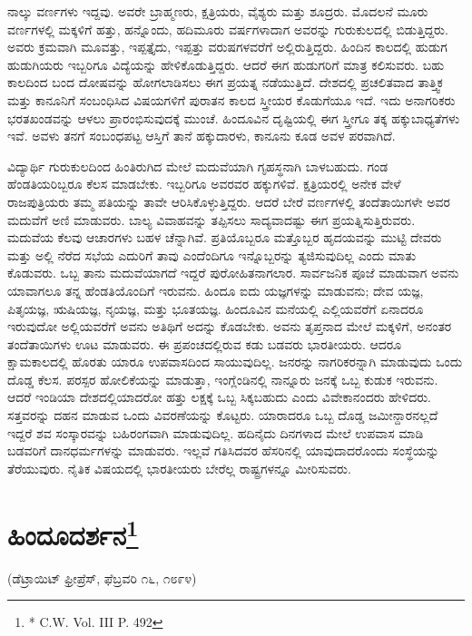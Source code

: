 ನಾಲ್ಕು ವರ್ಣಗಳು ಇದ್ದವು. ಅವರೇ ಬ್ರಾಹ್ಮಣರು, ಕ್ಷತ್ರಿಯರು, ವೈಶ್ಯರು ಮತ್ತು ಶೂದ್ರರು. ಮೊದಲನೆ ಮೂರು ವರ್ಣಗಳಲ್ಲಿ ಮಕ್ಕಳಿಗೆ ಹತ್ತು, ಹನ್ನೊಂದು, ಹದಿಮೂರು ವರ್ಷಗಳಾದಾಗ ಅವರನ್ನು ಗುರುಕುಲದಲ್ಲಿ ಬಿಡುತ್ತಿದ್ದರು. ಅವರು ಕ್ರಮವಾಗಿ ಮೂವತ್ತು, ಇಪ್ಪತ್ತೈದು, ಇಪ್ಪತ್ತು ವರುಷಗಳವರೆಗೆ ಅಲ್ಲಿರುತ್ತಿದ್ದರು. ಹಿಂದಿನ ಕಾಲದಲ್ಲಿ ಹುಡುಗ ಹುಡುಗಿಯರು ಇಬ್ಬರಿಗೂ ವಿದ್ಯೆಯನ್ನು ಹೇಳಿಕೊಡುತ್ತಿದ್ದರು. ಆದರೆ ಈಗ ಹುಡುಗರಿಗೆ ಮಾತ್ರ ಕಲಿಸುವರು. ಬಹು ಕಾಲದಿಂದ ಬಂದ ದೋಷವನ್ನು ಹೋಗಲಾಡಿಸಲು ಈಗ ಪ್ರಯತ್ನ ನಡೆಯುತ್ತಿದೆ. ದೇಶದಲ್ಲಿ ಪ್ರಚಲಿತವಾದ ತಾತ್ತ್ವಿಕ ಮತ್ತು ಕಾನೂನಿಗೆ ಸಂಬಂಧಿಸಿದ ವಿಷಯಗಳಿಗೆ ಪುರಾತನ ಕಾಲದ ಸ್ತ್ರೀಯರ ಕೊಡುಗೆಯೂ ಇದೆ. ಇದು ಅನಾಗರಿಕರು ಭರತಖಂಡವನ್ನು ಆಳಲು ಪ್ರಾರಂಭಿಸುವುದಕ್ಕೆ ಮುಂಚೆ. ಹಿಂದೂವಿನ ದೃಷ್ಟಿಯಲ್ಲಿ ಈಗ ಸ್ತ್ರೀಗೂ ತಕ್ಕ ಹಕ್ಕುಬಾಧ್ಯತೆಗಳು ಇವೆ. ಅವಳು ತನಗೆ ಸಂಬಂಧಪಟ್ಟ ಆಸ್ತಿಗೆ ತಾನೆ ಹಕ್ಕುದಾರಳು, ಕಾನೂನು ಕೂಡ ಅವಳ ಪರವಾಗಿದೆ.

ವಿದ್ಯಾರ್ಥಿ ಗುರುಕುಲದಿಂದ ಹಿಂತಿರುಗಿದ ಮೇಲೆ ಮದುವೆಯಾಗಿ ಗೃಹಸ್ಥನಾಗಿ ಬಾಳಬಹುದು. ಗಂಡ ಹೆಂಡತಿಯರಿಬ್ಬರೂ ಕೆಲಸ ಮಾಡಬೇಕು. ಇಬ್ಬರಿಗೂ ಅವರವರ ಹಕ್ಕುಗಳಿವೆ. ಕ್ಷತ್ರಿಯರಲ್ಲಿ ಅನೇಕ ವೇಳೆ ರಾಜಪುತ್ರಿಯರು ತಮ್ಮ ಪತಿಯನ್ನು ತಾವೇ ಆರಿಸಿಕೊಳ್ಳುತ್ತಿದ್ದರು. ಆದರೆ ಬೇರೆ ವರ್ಣಗಳಲ್ಲಿ ತಂದೆತಾಯಿಗಳೇ ಅವರ ಮದುವೆಗೆ ಅಣಿ ಮಾಡುವರು. ಬಾಲ್ಯ ವಿವಾಹವನ್ನು ತಪ್ಪಿಸಲು ಸಾದ್ಯವಾದಷ್ಟು ಈಗ ಪ್ರಯತ್ನಿಸುತ್ತಿರುವರು. ಮದುವೆಯ ಕೆಲವು ಆಚಾರಗಳು ಬಹಳ ಚೆನ್ನಾಗಿವೆ. ಪ್ರತಿಯೊಬ್ಬರೂ ಮತ್ತೊಬ್ಬರ ಹೃದಯವನ್ನು ಮುಟ್ಟಿ ದೇವರು ಮತ್ತು ಅಲ್ಲಿ ನೆರೆದ ಸಭೆಯ ಎದುರಿಗೆ ತಾವು ಎಂದೆಂದಿಗೂ ಇನ್ನೊಬ್ಬರನ್ನು ತ್ಯಜಿಸುವುದಿಲ್ಲ ಎಂದು ಮಾತು ಕೊಡುವರು. ಒಬ್ಬ ತಾನು ಮದುವೆ\break ಯಾಗದೆ ಇದ್ದರೆ ಪುರೋಹಿತನಾಗಲಾರ. ಸಾರ್ವಜನಿಕ ಪೂಜೆ ಮಾಡುವಾಗ ಅವನು ಯಾವಾಗಲೂ ತನ್ನ ಹೆಂಡತಿಯೊಂದಿಗೆ ಇರುವನು. ಹಿಂದೂ ಐದು ಯಜ್ಞಗಳನ್ನು ಮಾಡುವನು; ದೇವ ಯಜ್ಞ, ಪಿತೃಯಜ್ಞ, ಋಷಿಯಜ್ಞ, ನೃಯಜ್ಞ, ಮತ್ತು ಭೂತಯಜ್ಞ. ಹಿಂದೂವಿನ ಮನೆಯಲ್ಲಿ ಎಲ್ಲಿಯವರೆಗೆ ಏನಾದರೂ ಇರುವುದೋ ಅಲ್ಲಿಯವರೆಗೆ ಅವನು ಅತಿಥಿಗೆ ಅದನ್ನು ಕೊಡಬೇಕು. ಅವನು ತೃಪ್ತನಾದ ಮೇಲೆ ಮಕ್ಕಳಿಗೆ, ಅನಂತರ ತಂದೆತಾಯಿ\break ಗಳು ಊಟ ಮಾಡುವರು. ಈ ಪ್ರಪಂಚದಲ್ಲಿರುವ ಕಡು ಬಡವರು ಭಾರತೀಯರು. ಆದರೂ ಕ್ಷಾಮಕಾಲದಲ್ಲಿ ಹೊರತು ಯಾರೂ ಉಪವಾಸದಿಂದ ಸಾಯುವುದಿಲ್ಲ. ಜನರನ್ನು ನಾಗರಿಕರನ್ನಾಗಿ ಮಾಡುವುದು ಒಂದು ದೊಡ್ಡ ಕೆಲಸ. ಪರಸ್ಪರ ಹೋಲಿಕೆಯನ್ನು ಮಾಡುತ್ತಾ, ಇಂಗ್ಲೆಂಡಿನಲ್ಲಿ ನಾನ್ನೂರು ಜನಕ್ಕೆ ಒಬ್ಬ ಕುಡುಕ ಇರುವನು. ಆದರೆ ಇಂಡಿಯಾ ದೇಶದಲ್ಲಿಯಾದರೋ ಹತ್ತು ಲಕ್ಷಕ್ಕೆ ಒಬ್ಬ ಸಿಕ್ಕಬಹುದು ಎಂದು ವಿವೇಕಾನಂದರು ಹೇಳಿದರು. ಸತ್ತವರನ್ನು ದಹನ ಮಾಡುವ ಒಂದು ವಿವರಣೆಯನ್ನು ಕೊಟ್ಟರು. ಯಾರಾದರೂ ಒಬ್ಬ ದೊಡ್ಡ ಜಮೀನ್ದಾರನಲ್ಲದೆ ಇದ್ದರೆ ಶವ ಸಂಸ್ಕಾರವನ್ನು ಬಹಿರಂಗವಾಗಿ ಮಾಡುವುದಿಲ್ಲ. ಹದಿನೈದು ದಿನಗಳಾದ ಮೇಲೆ ಉಪವಾಸ ಮಾಡಿ ಬಡವರಿಗೆ ದಾನಧರ್ಮಗಳನ್ನು ಮಾಡುವರು. ಇಲ್ಲವೆ ಗತಿಸಿದವರ ಹೆಸರಿನಲ್ಲಿ ಯಾವುದಾದರೊಂದು ಸಂಸ್ಥೆಯನ್ನು ತೆರೆಯುವುರು. ನೈತಿಕ ವಿಷಯದಲ್ಲಿ ಭಾರತೀಯರು ಬೇರೆಲ್ಲ ರಾಷ್ಟ್ರಗಳನ್ನೂ ಮೀರಿಸುವರು.

\delimiter


\section[ಹಿಂದೂದರ್ಶನ]{ಹಿಂದೂದರ್ಶನ\protect\footnote{* C.W. Vol. III P. 492}}

\begin{center}
(ಡೆಟ್ರಾಯಿಟ್​ ಫ್ರೀಪ್ರೆಸ್​, ಫೆಬ್ರವರಿ ೧೬, ೧೮೯೪)
\end{center}

